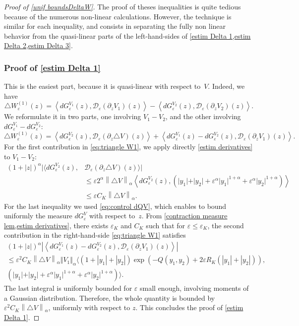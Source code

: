 \documentclass[JEP,XML,SOM,Unicode]{cedram}
\let\mathcal\mathscr
\theoremstyle{plain}
\theoremstyle{definition}
\newcommand{\D}{\mathcal{D}_\eps}
\let\eps\varepsilon
\let\ds\displaystyle
\newcommand{\abs}[1]{\left\lvert#1\right\rvert}
\newcommand{\norm}[1]{\left\lVert#1\right\rVert}
\newcommand{\QV}{G_\eps^V}
\newcommand{\dQVA}{dG_\eps^{V_1}}
\newcommand{\dQVB}{dG_\eps^{V_2}}
\newcommand{\RK}{R_K}
\begin{document}
\begin{proof}[Proof of \cref{unif boundsDeltaW}]
The proof of theses inequalities is quite tedious because of the numerous non-linear calculations. However, the technique is similar for each inequality, and consists in separating the fully non linear behavior from the quasi-linear parts of the left-hand-sides of \cref{estim Delta 1,estim Delta 2,estim Delta 3}.

\subsubsection*{Proof of \eqref{estim Delta 1}}
This is the easiest part, because it is quasi-linear with respect to~$V$. Indeed, we have
\begin{equation*}
\triangle W_\eps^{(1)}(z) = \left\langle \dQVA(z), \D(\partial_z V_1)(z)\right\rangle
- \left\langle \dQVB(z), \D(\partial_z V_2)(z) \right\rangle.
\end{equation*}
We reformulate it in two parts, one involving $V_1-V_2$, and the other involving \hbox{$\dQVA-\dQVB$}:
\begin{equation}\label{eq:triangle W1}
\triangle W_\eps^{(1)}(z)=
\left\langle \dQVB(z),\D(\partial_z \triangle V)(z) \right\rangle + \left\langle \dQVA(z)-\dQVB(z), \D(\partial_z V_1)(z) \right\rangle.
\end{equation}
For the first contribution in \eqref{eq:triangle W1}, we apply directly \cref{estim derivatives} to $V_1-V_2$:
\begin{align*}
\ds (1+\abs{z})^\alpha \bigl|\bigl\langle \dQVB(z),& \D(\partial_z \triangle V)(z) \bigr\rangle\bigr|\\
&
\leq \eps 2^\alpha \norm{ \triangle V}_\alpha \left\langle \dQVB(z), \left(\vert y_1 \vert+ \vert y_2 \vert + \eps^\alpha \vert y_1 \vert^{1+\alpha} + \eps^\alpha\vert y_2 \vert^{1+\alpha} \right) \right\rangle\\
& \leq \eps C_K \norm{\triangle V}_\alpha.
\end{align*}
For the last inequality we used \cref{eq:control dQV}, which enables to bound uniformly the measure $d\QV$ with respect to~$z$.
From \cref{contraction measure lem,estim derivatives}, there exists $\eps_K$ and $C_K$ such that for $\eps\leq \eps_K$, the second contribution in the right-hand-side \eqref{eq:triangle W1} satisfies
\begin{multline}\label{eq:truc}
\ds (1+\abs{z})^\alpha \abs{ \left\langle \dQVA(z)-\dQVB(z), \D(\partial_z V_1)(z) \right\rangle } \\
\leq \eps^2 C_K \norm{\triangle V}_\alpha \Vert V_1 \Vert_\alpha \Big\langle (1+\abs{y_1} + \abs{y_2}) \exp (-Q(y_1,y_2) + 2\eps \RK(\abs{y_1}+\abs{y_2})),
\\
\left(\vert y_1 \vert+ \vert y_2 \vert + \eps^\alpha\vert y_1 \vert^{1+\alpha} + \eps^\alpha\vert y_2 \vert^{1+\alpha} \right) \Big\rangle.
\end{multline}
The last integral is uniformly bounded for $\eps$ small enough, involving moments of a Gaussian distribution. Therefore, the whole quantity is bounded by $\eps^2 C_K \norm{\triangle V}_\alpha$, uniformly with respect to $z$. This concludes the proof of \cref{estim Delta 1}.


\end{proof}
\end{document}
